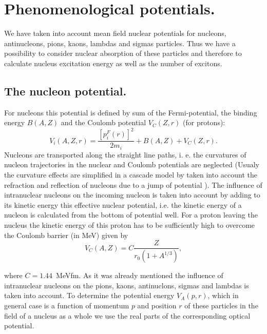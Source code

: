 \section{Phenomenological potentials.}
We have taken into account mean field nuclear potentials for nucleons, 
antinucleons, pions, kaons, lambdas and sigmas particles. Thus we have 
a possibility to consider nuclear absorption of these particles and 
therefore to calculate nucleus excitation energy as well as 
the number of excitons. 

\subsection{The nucleon potential.}
\hspace{1.0em}
For nucleons this potential is defined by sum of the Fermi-potential, the binding
energy $B(A,Z)$ and the Coulomb potential $V_{C}(Z,r)$ (for protons):
\begin{equation}
\label{PP1}
V_{i}(A,Z,r)=\frac{[p_{i}^F(r)]^{2}}{2m_{i}}+B(A,Z)+V_{C}(Z,r).
\end{equation}
Nucleons are transported along the straight line paths, i. e. the
curvatures of nucleon trajectories in the nuclear and Coulomb potentials
are neglected (Usualy the curvature effects are simplified in a cascade 
model by taken into account
the refraction and reflection of nucleons due to a jump of potential
\cite{BIST73}). The influence of intranuclear nucleons on the incoming
nucleon is taken into account by adding to its kinetic energy this
effective nuclear potential, i.e. the kinetic energy of a nucleon is
calculated from the bottom of potential well.  For a proton  leaving the
nucleus the kinetic energy of this proton has to be sufficiently high to
overcome the Coulomb barrier (in MeV) given by
\begin{equation}
\label{PP2}
V_{C}(A,Z)=C\frac{Z}{ r_{0}(1+A^{1/3})},
\end{equation}

where $C = 1.44$\ MeVfm. 
As it was already mentioned the influence of intranuclear nucleons on 
the pions, kaons, antinuclons, sigmas and lambdas 
 is  taken into account.
To determine the potential energy $V_{A}(p,r)$, which  in general case is a 
function  of  
momentum $p$ and  position $r$ of these particles
 in the field of a 
nucleus as a whole we use
the real parts of the corresponding optical potential. 

